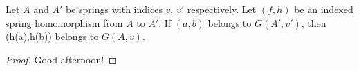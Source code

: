%

\begin{proposition}
  Let $A$ and $A'$ be springs with indices $v$, $v'$
  respectively. Let $(f,h)$ be an indexed spring homomorphism from $A$
  to $A'$. If $(a,b)$ belongs to $G(A',v')$, then (h(a),h(b))
  belongs to $G(A,v)$.
\end{proposition}
\begin{proof}
  Good afternoon!
\end{proof}
